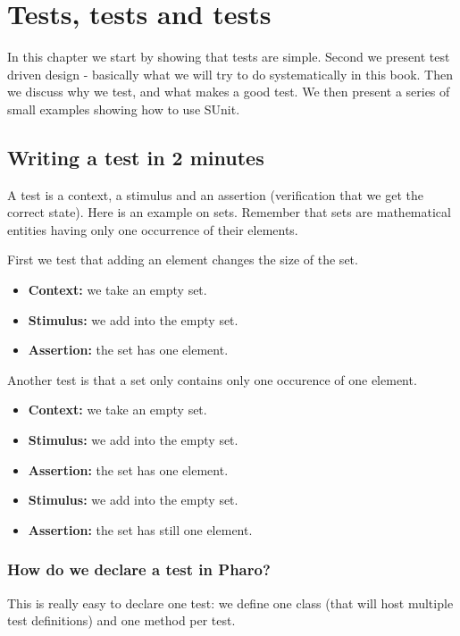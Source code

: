 \documentclass[10pt,twoside,english]{_support/latex/sbabook/sbabook}
\begin{document}
\frontmatter
\pagestyle{plain}

\tableofcontents*
\clearpage\listoffigures

\mainmatter

\chapter{Tests, tests and tests}\label{cha:sunit}
In this chapter we start by showing that tests are simple. Second we present test driven design - basically what we will try to do systematically in this book. Then we discuss why we test, and what makes a good test.
We then present a series of small examples showing how to use SUnit. 
\section{Writing a test in 2 minutes}
A test is a context, a stimulus and an assertion (verification that we get the correct state).
Here is an example on sets. Remember that sets are mathematical entities having only one occurrence of their elements.

First we test that adding an element changes the size of the set.

\begin{itemize}
\item \textbf{Context:} we take an empty set.
\item \textbf{Stimulus:} we add  into the empty set.
\item \textbf{Assertion:} the set has one element.
\end{itemize}

Another test is that a set only contains only one occurence of one element.

\begin{itemize}
\item \textbf{Context:} we take an empty set.
\item \textbf{Stimulus:} we add  into the empty set.
\item \textbf{Assertion:} the set has one element.
\item \textbf{Stimulus:} we add  into the empty set.
\item \textbf{Assertion:} the set has still one element.
\end{itemize}
\subsection{How do we declare a test in Pharo?}
This is really easy to declare one test: we define one class (that will host multiple test definitions) and one method per test.
\end{document}
